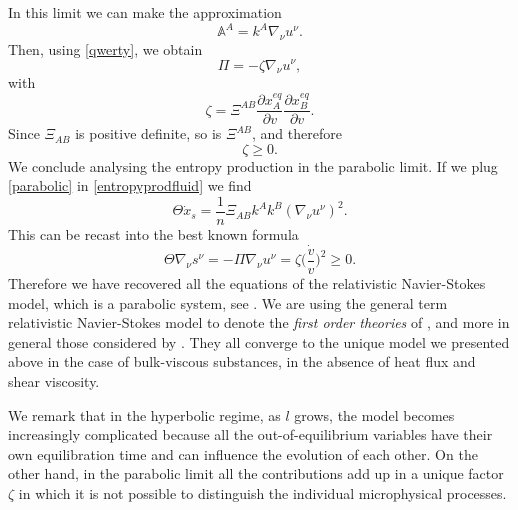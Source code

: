 \documentclass[useAMS,usenatbib,prd,twocolumn,nofootinbib]{revtex4-1}
\begin{document}
In this limit we can make the approximation
\begin{equation}\label{parabolic}
\mathbb{A}^A = k^A \nabla_\nu u^\nu .
\end{equation}
Then, using \eqref{qwerty}, we obtain
\begin{equation}
\Pi = -\zeta \nabla_\nu u^\nu ,
\end{equation}
with
\begin{equation}\label{zetta}
\zeta =\Xi^{AB} \dfrac{\partial x_A^{eq}}{\partial v} \dfrac{\partial x_B^{eq}}{\partial v}.
\end{equation}
Since $\Xi_{AB}$ is positive definite, so is $\Xi^{AB}$, and therefore
\begin{equation}
\zeta \geq 0.
\end{equation}
We conclude analysing the entropy production in the parabolic limit. If we plug \eqref{parabolic} in \eqref{entropyprodfluid} we find
\begin{equation}
\Theta \dot{x}_s = \dfrac{1}{n} \Xi_{AB} k^A k^B (\nabla_\nu u^\nu )^2.
\end{equation} 
This can be recast into the best known formula
\begin{equation}\label{sbluearf}
\Theta \nabla_\nu s^\nu = -\Pi \nabla_\nu u^\nu = \zeta \bigg( \dfrac{\dot{v}}{v} \bigg)^2 \geq 0.
\end{equation}
Therefore we have recovered all the equations of the relativistic Navier-Stokes model, which is a parabolic system, see \cite{Geroch95}. We are using the general term relativistic Navier-Stokes model to denote the \textit{first order theories} of \citet{Eckart40}, \citet{landau6} and more in general those considered by \citet{Hiscock_Insatibility_first_order}. They all converge to the unique model we presented above in the case of bulk-viscous substances, in the absence of heat flux and shear viscosity.


We remark that in the hyperbolic regime, as $l$ grows, the model becomes increasingly complicated because all the out-of-equilibrium variables have their own equilibration time and can influence the evolution of each other. 
On the other hand, in the parabolic limit  all the contributions add up in a unique factor $\zeta$ in which it is not possible to distinguish the individual microphysical processes. 

\end{document}
